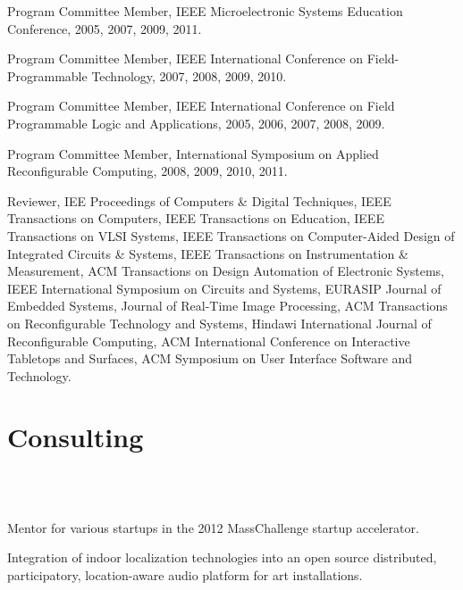 \documentclass[line]{res}
\begin{document}
\begin{resume}
	Program Committee Member, IEEE Microelectronic Systems Education Conference, 2005, 2007, 2009, 2011.
	
	Program Committee Member, IEEE International Conference on Field-Programmable Technology, 2007, 2008, 2009, 2010.
	
	Program Committee Member, IEEE International Conference on Field Programmable Logic and Applications, 2005, 2006, 2007, 2008, 2009.
	
	Program Committee Member, International Symposium on Applied Reconfigurable Computing, 2008, 2009, 2010, 2011.
	
	Reviewer, IEE Proceedings of Computers \& Digital Techniques, IEEE Transactions on Computers, IEEE Transactions on Education, IEEE Transactions on VLSI Systems, IEEE Transactions on Computer-Aided Design of Integrated Circuits \& Systems, IEEE Transactions on Instrumentation \& Measurement, ACM Transactions on Design Automation of Electronic Systems, IEEE International Symposium on Circuits and Systems, EURASIP Journal of Embedded Systems, Journal of Real-Time Image Processing, ACM Transactions on Reconfigurable Technology and Systems, Hindawi International Journal of Reconfigurable Computing, ACM International Conference on Interactive Tabletops and Surfaces, ACM Symposium on User Interface Software and Technology.
	
	\section{\sc Consulting}
	\begin{format}
		\\
		\body\\
	\end{format}

	\begin{position}
		Mentor for various startups in the 2012 MassChallenge startup accelerator.
	\end{position}
	
	\begin{position}
		Integration of indoor localization technologies into an open source distributed, participatory, location-aware audio platform for art installations.
	\end{position}
	

\end{resume}
\end{document}
